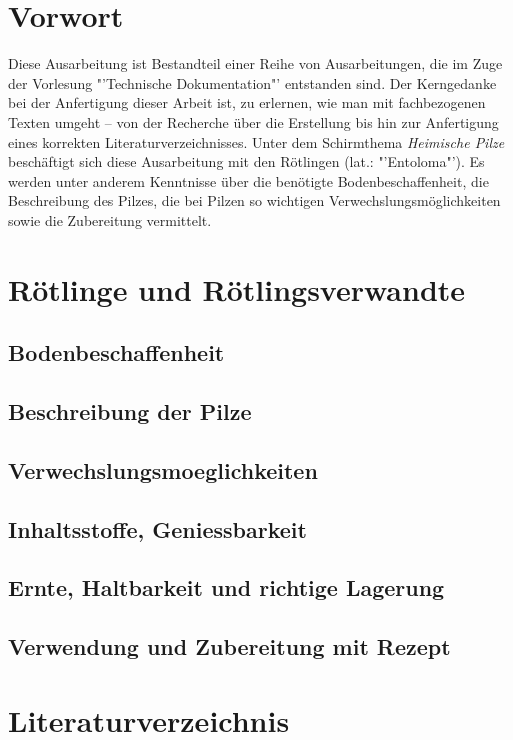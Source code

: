 \documentclass[a4paper,abstracton]{scrreprt}
\begin{document}


\tableofcontents

\begin{abstract}
\begin{quote}%
Diese Arbeit befasst sich mit Pizlen und so nem kram. kein scheiss
\end{quote} 
\end{abstract}

\chapter{Vorwort}
Diese Ausarbeitung ist Bestandteil einer Reihe von Ausarbeitungen, die im Zuge der Vorlesung "'Technische Dokumentation"' entstanden sind. Der Kerngedanke bei der Anfertigung dieser Arbeit ist, zu erlernen, wie man mit fachbezogenen Texten umgeht -- von der Recherche über die Erstellung bis hin zur Anfertigung eines korrekten Literaturverzeichnisses. Unter dem Schirmthema \emph{Heimische Pilze} beschäftigt sich diese Ausarbeitung mit den Rötlingen (lat.: "'Entoloma"'). Es werden unter anderem Kenntnisse über die benötigte Bodenbeschaffenheit, die Beschreibung des Pilzes, die bei Pilzen so wichtigen Verwechslungsmöglichkeiten sowie die Zubereitung vermittelt.

\chapter{Rötlinge und Rötlingsverwandte}
\section{Bodenbeschaffenheit}
\section{Beschreibung der Pilze}
\section{Verwechslungsmoeglichkeiten}
\section{Inhaltsstoffe, Geniessbarkeit}
\section{Ernte, Haltbarkeit und richtige Lagerung}
\section{Verwendung und Zubereitung mit Rezept}

\chapter{Literaturverzeichnis}
\end{document}
